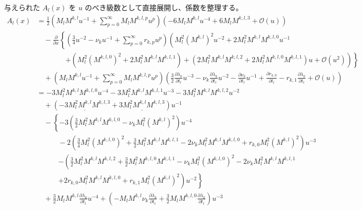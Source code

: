 与えられた $A_l(x)$ を $u$ のべき級数として直接展開し、係数を整理する。
\begin{align*}
    A_l(x) &= \frac{1}{2} \left( M_l M^{k,l} u^{-1} + \sum_{p=0}^\infty M_l M^{k,l,p} u^p \right) \left( -6 M_l M^{k,l} u^{-4} + 6 M_l M^{k,l,3} + \mathcal{O}(u) \right) \\
    &\quad - \frac{\partial}{\partial x} \left\{ \left( \frac{3}{4} u^{-2} - \nu_k u^{-1} + \sum_{p=0}^\infty r_{k,p} u^p \right) \left( M_l^2 (M^{k,l})^2 u^{-2} + 2M_l^2 M^{k,l} M^{k,l,0} u^{-1} \right. \right. \\
    &\hspace{4em} \left. \left. + (M_l^2(M^{k,l,0})^2 + 2M_l^2 M^{k,l} M^{k,l,1}) + (2M_l^2 M^{k,l} M^{k,l,2} + 2M_l^2 M^{k,l,0} M^{k,l,1}) u + \mathcal{O}(u^2) \right) \right\} \\
    &\quad + \left( M_l M^{k,l} u^{-1} + \sum_{p=0}^\infty M_l M^{k,l,p} u^p \right) \left( \frac{3}{2} \frac{\partial \lambda_k}{\partial t_l} u^{-3} - \nu_k \frac{\partial \lambda_k}{\partial t_l} u^{-2} - \frac{\partial \nu_k}{\partial t_l} u^{-1} + \frac{\partial r_{k,0}}{\partial t_l} - r_{k,1}\frac{\partial \lambda_{k}}{\partial t_l} + \mathcal{O}(u) \right) \\
    &= -3 M_l^2 M^{k,l} M^{k,l,0} u^{-4} - 3 M_l^2 M^{k,l} M^{k,l,1} u^{-3} - 3 M_l^2 M^{k,l} M^{k,l,2} u^{-2} \\
    &\quad + \left( \underline{-3 M_l^2 M^{k,l} M^{k,l,3}} + \underline{3 M_l^2 M^{k,l} M^{k,l,3}} \right) u^{-1} \\
    &\quad - \left\{ -3 \left( \frac{3}{2} M_l^2 M^{k,l} M^{k,l,0} - \nu_k M_l^2 (M^{k,l})^2 \right) u^{-4} \right. \\
    &\hspace{3em} - 2 \left( \frac{3}{4} M_l^2 (M^{k,l,0})^2 + \frac{3}{2} M_l^2 M^{k,l} M^{k,l,1} - 2\nu_k M_l^2 M^{k,l} M^{k,l,0} + r_{k,0} M_l^2 (M^{k,l})^2 \right) u^{-3} \\
    &\hspace{3em} \left. - \left( \frac{3}{2} M_l^2 M^{k,l} M^{k,l,2} + \frac{3}{2} M_l^2 M^{k,l,0} M^{k,l,1} - \nu_k M_l^2 (M^{k,l,0})^2 - 2\nu_k M_l^2 M^{k,l} M^{k,l,1} \right. \right.\\
    &\hspace{3em}\left. \left.+ 2 r_{k,0} M_l^2 M^{k,l} M^{k,l,0} + r_{k,1} M_l^2 (M^{k,l})^2 \right) u^{-2} \right\} \\
    &\quad + \frac{3}{2} M_l M^{k,l} \frac{\partial \lambda_k}{\partial t_l} u^{-4} + \left( - M_l M^{k,l} \nu_k \frac{\partial \lambda_k}{\partial t_l} + \frac{3}{2} M_l M^{k,l,0} \frac{\partial \lambda_k}{\partial t_l} \right) u^{-3} \\

\end{align*}
